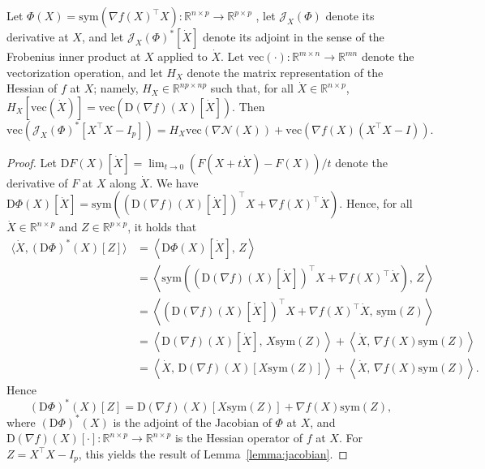 \documentclass[twoside,11pt]{article}
\newcommand{\sym}{{\mathrm{sym}}}
\newcommand{\bR}{\mathbb{R}}    %
\newcommand{\Jacob}[2]{\mathcal{J}_{#2}\left(#1\right)}
\newcommand{\vect}[1]{\mathrm{vec}\left(#1\right)}
\newcommand{\cN}{\mathcal{N}} %
\newcommand{\vectHess}[1]{H_{#1}} %
\newcommand{\inner}[2]{\left\langle#1,\,#2\right\rangle} %
\begin{document}
\begin{lemma} \label{lemma:jacobian}
    Let $\Phi(X) = \sym(\nabla f(X)^{\top} X) :\bR^{n\times p} \rightarrow \bR^{p\times p}$ , 
    let $\Jacob{\Phi}{X}$ denote its derivative at $X$, and let $\Jacob{\Phi}{X}^*[\dot{X}]$ denote its adjoint in the sense of the Frobenius inner product at $X$ applied to $\dot{X}$. Let $\vect{\cdot}:\bR^{m \times n} \rightarrow \bR^{mn}$ denote the vectorization operation, and let $\vectHess{X}$ denote the matrix representation of the Hessian of $f$ at $X$; namely, $\vectHess{X} \in \mathbb{R}^{np\times np}$ such that, for all $\dot{X}\in\mathbb{R}^{n\times p}$, $\vectHess{X}[\vect{\dot{X}}] = \vect{\mathrm{D}(\nabla f)(X)[\dot{X}]}$. Then 
    \begin{equation*}
        \vect{\Jacob{\Phi}{X}^* [X^{\top}X - I_p]} = \vectHess{X} \vect{\nabla \cN (X)} + \vect{\nabla f(X)(X^{\top}X - I)}.
    \end{equation*}
\end{lemma}
\begin{proof}
    Let $\mathrm{D}F(X)[\dot{X}] = \lim_{t\to0} (F(X+t\dot{X})-F(X))/t$ denote the derivative of $F$ at $X$ along $\dot{X}$. We have $\mathrm{D}\Phi(X)[\dot{X}] = \sym(\left(\mathrm{D}(\nabla f)(X)[\dot{X}]\right)^{\top} X + \nabla f(X)^{\top} \dot{X})$. Hence, for all $\dot{X}\in\mathbb{R}^{n\times p}$ and $Z\in \mathbb{R}^{p\times p}$,
    it holds that 
    \begin{align}
        \langle \dot{X}, (\mathrm{D}\Phi)^*(X)[Z]\rangle 
        &= \inner{\mathrm{D}\Phi(X)[\dot{X}]}{Z} \\
        &= \inner{\sym(\left(\mathrm{D}(\nabla f)(X)[\dot{X}]\right)^{\top} X + \nabla f(X)^{\top} \dot{X})}{Z}\\
        &= \inner{\left(\mathrm{D}(\nabla f)(X)[\dot{X}]\right)^{\top} X + \nabla f(X)^{\top} \dot{X}}{\sym(Z)}\\
        &=\inner{\mathrm{D}(\nabla f)(X)[\dot{X}]}{ X\sym(Z)} + \inner{ \dot{X}}{\nabla f(X)\sym(Z)}\\
        &= \inner{\dot{X}}{\mathrm{D}(\nabla f)(X)[X\sym(Z)]} + \inner{\dot{X}}{\nabla f(X)\sym(Z)}.
    \end{align}
    Hence 
    \[
    (\mathrm{D}\Phi)^*(X)[Z] = \mathrm{D}(\nabla f)(X)[X\sym(Z)] + \nabla f(X)\sym(Z),
    \]
    where $(\mathrm{D}\Phi)^*(X)$ is the adjoint of the Jacobian of $\Phi$ at $X$, and $\mathrm{D}(\nabla f)(X)[\cdot]: \mathbb{R}^{n\times p} \to \mathbb{R}^{n\times p}$ is the Hessian operator of $f$ at $X$. For $Z = X^{\top} X-I_p$, this yields the result of Lemma~\ref{lemma:jacobian}.
\end{proof}
\end{document}

